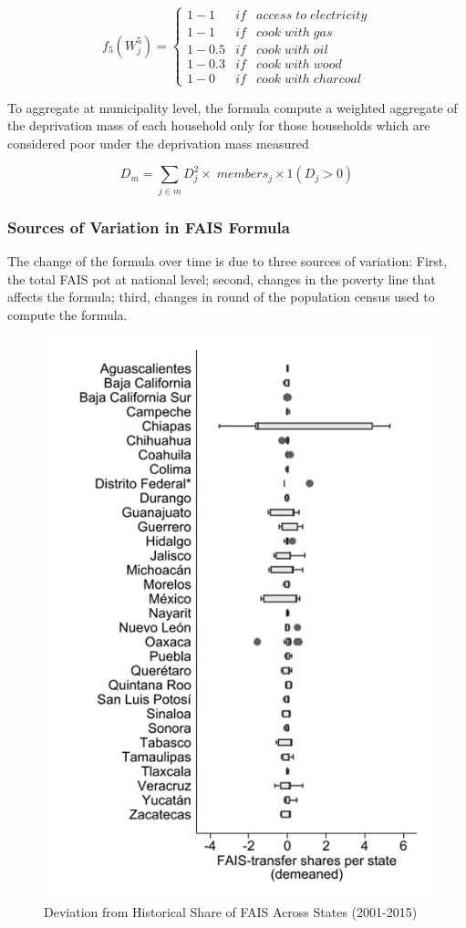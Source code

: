 \documentclass[dv_diss_main.tex]{subfiles}
\begin{document}
$$f_{5}(W_{j}^{5})= \left\{ 
\begin{array}{lcl}
    1-1      &   if  & access\; to\; electricity \\
    1-1      &   if  & cook\; with\; gas \\
    1-0.5    &   if  & cook\; with\; oil \\
    1-0.3    &   if  & cook\; with\; wood \\
    1-0      &   if  & cook\; with\; charcoal
\end{array}$$


To aggregate at municipality level, the formula compute a weighted aggregate of the deprivation mass of each household only for those households which are considered poor under the deprivation mass measured

$$D_{m} = \sum_{j\in m} D_j^2 \times \;members_{j} \times 1(D_j>0) $$

\newpage
\subsubsection{Sources of Variation in FAIS Formula}\label{ap:overtime}

The change of the formula over time is due to three sources of variation: First, the total FAIS pot at national level; second, changes in the poverty line that affects the formula; third, changes in round of the population census used to compute the formula. 

\begin{figure}[H] 
		\centering
		
		\includegraphics[width=0.67\linewidth]{figures/distribution_states.png}
		\caption{Deviation from Historical Share of FAIS Across States (2001-2015)}\label{fig:B1}
		
		\parbox{\textwidth}{\small 
		\vspace{2eX}
		\footnotesize	
		\faisvariation
		}
	
\end{figure}
\end{document}
